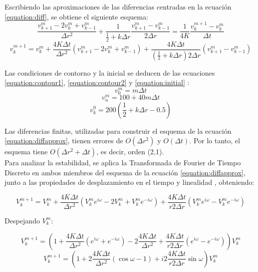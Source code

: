 \documentclass[journal, monochrome]{IEEEtran}
\begin{document}
Escribiendo las aproximaciones de las diferencias centradas en la ecuación \eqref{equation:diff}, se obtiene el siguiente esquema: \\
\begin{equation}
\frac{v_{k+1}^{m} - 2v_{k}^{m} + v_{k-1}^{m}}{\Delta r^{2}} + \frac{1}{\frac{1}{2}+k\Delta r} \frac{v_{k+1}^{m}-v_{k-1}^{m}}{2\Delta r} = \frac{1}{4K} \frac{v_{k}^{m+1} - v_{k}^{m}}{\Delta t}
\end{equation}
\begin{equation}
v_{k}^{m+1} = v_{k}^{m} + \frac{4K\Delta t}{\Delta r^{2}} (v_{k+1}^{m} - 2v_{k}^{m} + v_{k-1}^{m}) + \frac{4K\Delta t}{(\frac{1}{2}+k\Delta r)2\Delta r} (v_{k+1}^{m}-v_{k-1}^{m})
\label{equation:diffapprox}
\end{equation}

Las condiciones de contorno y la inicial se deducen de las ecuaciones \eqref{equation:contour1}, \eqref{equation:contour2} y \eqref{equation:initial} :
\begin{equation}
v_{0}^{m} = m\Delta t 
\label{equation:vcontour1}
\end{equation}
\begin{equation}
v_{n}^{m} = 100 + 40m\Delta t 
\label{equation:vcontour2}
\end{equation}
\begin{equation}
v_{k}^{0} = 200(\frac{1}{2}+k\Delta r - 0.5) 
\label{equation:vinitial}
\end{equation}

Las diferencias finitas, utilizadas para construir el esquema de la ecuación \eqref{equation:diffapprox}, tienen errores de $O(\Delta r^{2})$ y $O(\Delta t)$. Por lo tanto, el esquema tiene $O(\Delta r^{2} + \Delta t)$, es decir, orden (2,1). \\

Para analizar la estabilidad, se aplica la Transformada de Fourier de Tiempo Discreto en ambos miembros del esquema de la ecuación \eqref{equation:diffapprox}, junto a las propiedades de desplazamiento en el tiempo y linealidad \citep{mathews}, obteniendo:

\begin{equation}
V_{k}^{m+1} = V_{k}^{m} + \frac{4K\Delta t}{\Delta r^{2}} (V_{k}^{m} e^{i\omega}- 2V_{k}^{m} + V_{k}^{m} e^{-i\omega}) + \frac{4K\Delta t}{r 2\Delta r} (V_{k}^{m} e^{i\omega} - V_{k}^{m} e^{-i\omega})
\end{equation}

Despejando $V_{k}^{m}$:

\begin{equation}
V_{k}^{m+1} = (1 + \frac{4K\Delta t}{\Delta r^{2}} (e^{i\omega} + e^{-i\omega}) - 2\frac{4K\Delta t}{\Delta r^{2}} + \frac{4K\Delta t}{r 2\Delta r} (e^{i\omega} - e^{-i\omega})) V_{k}^{m}
\end{equation}
\begin{equation}
V_{k}^{m+1} = (1 + 2 \frac{4K\Delta t}{\Delta r^{2}}(\cos \omega - 1) + i 2 \frac{4K\Delta t}{r 2\Delta r} \sin \omega) V_{k}^{m}
\end{equation}
\end{document}
